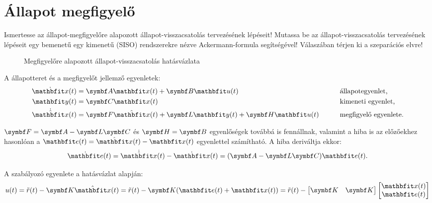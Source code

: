 \section{Állapot megfigyelő}

\begin{about}
  Ismertesse az állapot-megfigyelőre alapozott állapot-visszacsatolás
  tervezésének lépéseit! Mutassa be az állapot-visszacsatolás tervezésének
  lépéseit egy bemenetű egy kimenetű (SISO) rendszerekre nézve Ackermann-formula
  segítségével! Válaszában térjen ki a szeparációs elvre!
\end{about}

\begin{figure}[htb]
  \centering
  
  \caption{Megfigyelőre alapozott állapot-visszacsatolás hatásvázlata}
  \label{fig:observer-K}
\end{figure}

A állapotteret és a megfigyelőt jellemző egyenletek:
\begin{alignat}{9}
  \dot{\rvec x}(t) & = \rmat A \rvec x(t) + \rmat B \rvec u(t)
                   &
                   & \text{állapotegyenlet,}
  \\
  \rvec y(t)       & = \rmat C \rvec x(t)
                   &
                   & \text{kimeneti egyenlet,}
  \\
  \dot{\hvec x}(t) & = \rmat F \hvec x(t) + \rmat L \rvec y(t) + \rmat H \rvec u(t) \quad \quad
                   &
                   & \text{megfigyelő egyenlete.}
\end{alignat}

$\rmat F = \rmat A - \rmat L \rmat C$ és $\rmat H = \rmat B$ egyenlőségek
továbbá is fennállnak, valamint a hiba is az előzőekhez hasonlóan a $\rvec e(t)
  = \hvec x(t) - \rvec x(t)$ egyenlettel számítható. A hiba deriváltja ekkor:
\begin{equation}
  \dot{\rvec e}(t)
  = \dot{\hvec x}(t) - \dot{\rvec x}(t)
  = (\rmat A - \rmat L \rmat C) \rvec e(t).
\end{equation}

A szabályozó egyenlete a hatásvázlat alapján:
\begin{equation}
  u(t)
  = \tilde r(t) - \rmat K \hvec x(t)
  = \tilde r(t) - \rmat K (\rvec e(t) + \rvec x(t))
  = \tilde r(t) - \begin{bmatrix}
    \rmat K & \rmat K
  \end{bmatrix} \begin{bmatrix}
    \rvec x(t) \\ \rvec e(t)
  \end{bmatrix}
\end{equation}

